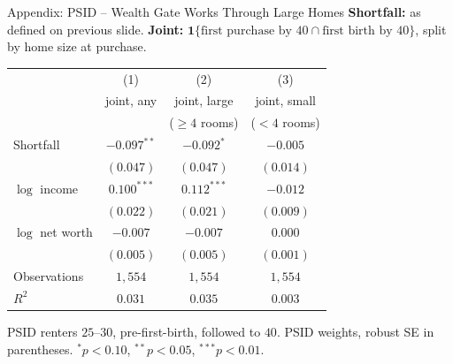 \documentclass[11pt,aspectratio=169]{beamer}
\begin{document}
\begin{frame}{Appendix: PSID -- Wealth Gate Works Through Large Homes}
\label{app:hacamo_replica_body}
\footnotesize
\textbf{Shortfall:} as defined on previous slide.\quad
\textbf{Joint:} $\mathbf{1}\{\text{first purchase by } 40 \cap \text{first birth by } 40\}$, split by home size at purchase.

\smallskip
\centering
\begin{tabular}{lccc}
\toprule
 & (1) & (2) & (3) \\
 & joint, any & joint, large & joint, small \\
 & & ($\geq 4$ rooms) & ($<4$ rooms) \\
\midrule
Shortfall          & $-0.097^{**}$ & $-0.092^{*}$ & $-0.005$  \\
                   & $(0.047)$     & $(0.047)$    & $(0.014)$ \\
\addlinespace
$\log$ income      & $0.100^{***}$ & $0.112^{***}$ & $-0.012$  \\
                   & $(0.022)$     & $(0.021)$    & $(0.009)$ \\
\addlinespace
$\log$ net worth   & $-0.007$      & $-0.007$     & $0.000$   \\
                   & $(0.005)$     & $(0.005)$    & $(0.001)$ \\
\midrule
Observations       & $1{,}554$     & $1{,}554$    & $1{,}554$ \\
$R^2$              & $0.031$       & $0.035$      & $0.003$   \\
\bottomrule
\end{tabular}

\smallskip
\scriptsize PSID renters $25$--$30$, pre-first-birth, followed to $40$. PSID weights, robust SE in parentheses. $^{*}p<0.10$, $^{**}p<0.05$, $^{***}p<0.01$.
\end{frame}

\end{document}
